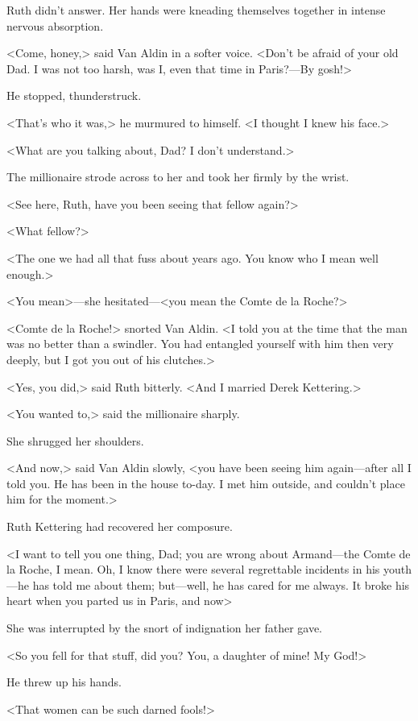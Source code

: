 Ruth didn't answer. Her hands were kneading themselves together in intense nervous absorption.

<Come, honey,> said Van Aldin in a softer voice. <Don't be afraid of your old Dad. I was not too harsh, was I, even that time in Paris?—By gosh!>

He stopped, thunderstruck.

<That's who it was,> he murmured to himself. <I thought I knew his face.>

<What are you talking about, Dad? I don't understand.>

The millionaire strode across to her and took her firmly by the wrist.

<See here, Ruth, have you been seeing that fellow again?>

<What fellow?>

<The one we had all that fuss about years ago. You know who I mean well enough.>

<You mean>—she hesitated—<you mean the Comte de la Roche?>

<Comte de la Roche!> snorted Van Aldin. <I told you at the time that the man was no better than a swindler. You had entangled yourself with him then very deeply, but I got you out of his clutches.>

<Yes, you did,> said Ruth bitterly. <And I married Derek Kettering.>

<You wanted to,> said the millionaire sharply.

She shrugged her shoulders.

<And now,> said Van Aldin slowly, <you have been seeing him again—after all I told you. He has been in the house to-day. I met him outside, and couldn't place him for the moment.>

Ruth Kettering had recovered her composure.

<I want to tell you one thing, Dad; you are wrong about Armand—the Comte de la Roche, I mean. Oh, I know there were several regrettable incidents in his youth—he has told me about them; but—well, he has cared for me always. It broke his heart when you parted us in Paris, and now\longdash>

She was interrupted by the snort of indignation her father gave.

<So you fell for that stuff, did you? You, a daughter of mine! My God!>

He threw up his hands.

<That women can be such darned fools!>